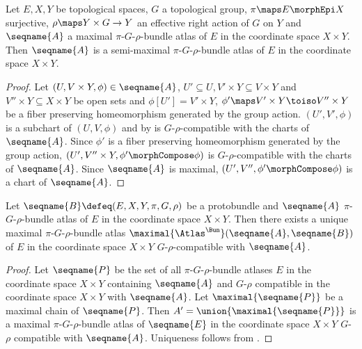 \documentclass{article}
\begin{document}
\begin{lemma}
Let $E,X,Y$ be topological spaces, $G$ a topological group,
$\pi \maps E \morphEpi X$ surjective, $\rho \maps Y \times G \to Y$ an
effective right action of $G$ on $Y$ and $\seqname{A}$ a maximal
$\pi$-$G$-$\rho$-bundle atlas of $E$ in the coordinate space $X \times Y$.
Then $\seqname{A}$ is a semi-maximal $\pi$-$G$-$\rho$-bundle atlas of $E$ in the
coordinate space $X \times Y$.

\begin{proof}
Let $(U, V \times Y, \phi) \in \seqname{A}$,
$U' \subseteq U, V' \times Y \subseteq V \times Y$ and
$V'' \times Y \subseteq X \times Y$ be open sets and
$\phi[U'] = V' \times Y$, $\phi' \maps V' \times Y \toiso V'' \times Y$
be a fiber preserving homeomorphism generated by the group action.
$(U', V', \phi)$ is a subchart of $(U,V,\phi)$ and by
 is $G$-$\rho$-compatible with the charts of
$\seqname{A}$.  Since $\phi'$ is a fiber preserving homeomorphism
generated by the group action, $(U', V'' \times Y, \phi' \morphCompose \phi)$
is $G$-$\rho$-compatible with the charts of $\seqname{A}$. Since
$\seqname{A}$ is maximal, $(U', V'', \phi' \morphCompose \phi)$ is a chart of
$\seqname{A}$.
\end{proof}
\end{lemma}

\begin{theorem}
Let $\seqname{B} \defeq (E, X, Y, \pi, G, \rho)$ be a protobundle and
$\seqname{A}$ $\pi$-$G$-$\rho$-bundle atlas of $E$ in the coordinate
space $X \times Y$. Then there exists a unique maximal
$\pi$-$G$-$\rho$-bundle atlas
$\maximal{\Atlas^\Bun}(\seqname{A},\seqname{B})$ of $E$ in the
coordinate space $X \times Y$ $G$-$\rho$-compatible with $\seqname{A}$.

\begin{proof}
Let $\seqname{P}$ be the set of all $\pi$-$G$-$\rho$-bundle atlases $E$
in the coordinate space $X \times Y$ containing $\seqname{A}$ and
$G$-$\rho$ compatible in the coordinate space $X \times Y$ with
$\seqname{A}$. Let $\maximal{\seqname{P}}$ be a maximal chain of
$\seqname{P}$. Then $A'=\union{\maximal{\seqname{P}}}$ is a maximal
$\pi$-$G$-$\rho$-bundle atlas of $\seqname{E}$ in the coordinate space
$X \times Y$ $G$-$\rho$ compatible with $\seqname{A}$. Uniqueness
follows from .
\end{proof}
\end{theorem}
\end{document}
